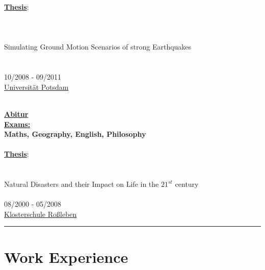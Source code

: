 \documentclass{article}
\begin{document}
\begin{minipage}[t]{0.7\textwidth}
\begin{minipage}[t]{0.33\textwidth}
	\textbf{\underline{Thesis}}:\\
	\href{https://www.dropbox.com/s/3kngo4hpb0c47ww/Bachelorarbeit.pdf?dl=0}{}\\\\\\
	Simulating Ground Motion Scenarios of strong Earthquakes\\\\\\
	{10/2008 - 09/2011}\\
\href{https://www.uni-potsdam.de/}{\color{pblue}Universität Potsdam}\\\\
		\end{minipage}
		\hfill
		\begin{minipage}[t]{0.25\textwidth}
	\textbf{\large \href{https://www.dropbox.com/s/nsgmvy7o64xb9si/Abiturzeugnis.pdf?dl=0}{\color{pblue}\faGraduationCap\hspace{1mm}Abitur}}\\
	\textbf{\underline{Exams:}}\\
	\textbf{Maths, Geography, English, Philosophy}\\\\
	\textbf{\underline{Thesis}}:\\
	 \\\\
	  Natural Disasters and their Impact on Life in the  $21^{st}$ century\\\\
	 08/2000 - 05/2008\\
	 \href{https://www.klosterschule.de/}{\color{pblue}Klosterschule Roßleben}
		\end{minipage}
		\vspace{-5mm}
		\hrule
		\vspace{-1mm}
		\section*{\fontsize{18pt}{24pt}\selectfont \color{pblue} Work Experience}
		

\end{minipage}
\end{document}
